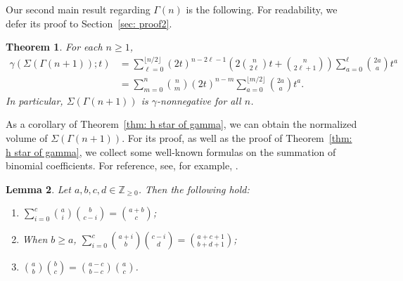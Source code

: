 \documentclass{amsart}
\numberwithin{equation}{section}
\theoremstyle{plain}
\newtheorem{thm}{Theorem}[section]
\newtheorem{lem}[thm]{Lemma}
\theoremstyle{definition}
\newcommand{\ZZ}{\mathbb{Z}}
\begin{document}
Our second main result regarding $\Gamma(n)$ is the following. 
For readability, we defer its proof to Section~\ref{sec: proof2}.

\begin{thm}\label{thm: gamma vec}
    For each $n \geq 1$,
    \begin{align*}%
        \gamma(\Sigma(\Gamma(n+1));t)&=\sum_{\ell=0}^{\lfloor n/2 \rfloor}(2t)^{n-2\ell-1}\left(2\binom{n}{2\ell}t+\binom{n}{2\ell+1}\right)\sum_{a=0}^\ell\binom{2a}{a}t^a\\
            &=    \sum_{m = 0}^{n}
    \binom{n}{m}
    (2t)^{n-m} 
    \sum_{a=0}^{\lfloor m/2 \rfloor} \binom{2a}{a} t^a.
    \end{align*}
    In particular, $\Sigma(\Gamma(n+1))$ is $\gamma$-nonnegative for all $n$.
\end{thm}

As a corollary of Theorem~\ref{thm: h star of gamma}, we can obtain the normalized volume of $\Sigma(\Gamma(n+1))$. 
For its proof, as well as the proof of Theorem~\ref{thm: h star of gamma}, 
we collect some well-known formulas on the summation of binomial coefficients.
For reference, see, for example, \cite[Equations (5.22), (5.26), (5.21)]{GrahamKnuthPatashnik}.
\begin{lem}\label{lem:binom}
    Let $a,b,c,d \in \ZZ_{\geq 0}$. Then the following hold{\rm :} 
    \begin{enumerate}[label={\rm (\roman*)}]
        \item $\sum_{i=0}^c \binom{a}{i}\binom{b}{c-i}=\binom{a+b}{c}${\rm ;}
        \item When $b \geq a$, $\sum_{i=0}^c \binom{a+i}{b}\binom{c-i}{d}=\binom{a+c+1}{b+d+1}${\rm ;}
        \item $\binom{a}{b}\binom{b}{c}=\binom{a-c}{b-c}\binom{a}{c}$.
    \end{enumerate}
\end{lem}
\end{document}
